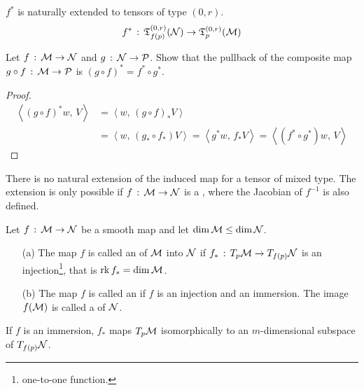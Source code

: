 \documentclass[a4paper, 10pt]{article}
\begin{document}
\begin{remark}
    $f^{\ast}$ is naturally extended to tensors of type $(0,r)$.
    \[ f^{\ast} \,:\, \mathfrak{T}^{(0,r)}_{f(p)}(\mathcal{N}) \rightarrow \mathfrak{T}^{(0,r)}_{p}(\mathcal{M}) \]
\end{remark}
\newpage


\begin{exer}
    Let $f\,:\,\mathcal{M}\rightarrow\mathcal{N}$ and $g\,:\,\mathcal{N}\rightarrow\mathcal{P}$. Show that the pullback of the composite map $g\circ f\,:\, \mathcal{M}\rightarrow\mathcal{P}$ is $(g\circ f)^{\ast} = f^{\ast} \circ g^{\ast}$.
\end{exer}
\begin{proof}
    \begin{align*}
        \left<(g\circ f)^{\ast}w,\,V\right> &= \left<w,\,(g\circ f)_{\ast}V\right> \\
        &= \left<w,\,(g_{\ast}\circ f_{\ast})V\right> = \left<g^{\ast}w,\,f_{\ast}V\right> = \left<(f^{\ast}\circ g^{\ast})w,\,V\right>
    \end{align*}
\end{proof}

\begin{remark}
    There is no natural extension of the induced map for a tensor of mixed type. The extension is only possible if $f\,:\,\mathcal{M}\rightarrow\mathcal{N}$ is a , where the Jacobian of $f^{-1}$ is also defined.
\end{remark}

\begin{definition}
    Let $f\,:\,\mathcal{M}\rightarrow\mathcal{N}$ be a smooth map and let $\dim \mathcal{M} \leq \dim \mathcal{N}$.
    \begin{itemize}
        \item[(a)] The map $f$ is called an  of $\mathcal{M}$ into $\mathcal{N}$ if $f_{\ast}\,:\,T_{p}\mathcal{M}\rightarrow T_{f(p)}\mathcal{N}$ is an injection\footnote{one-to-one function.}, that is $\mathrm{rk}\,f_{\ast} = \dim \mathcal{M}$.
        \item[(b)] The map $f$ is called an  if $f$ is an injection and an immersion. The image $f(\mathcal{M})$ is called a  of $\mathcal{N}$.
    \end{itemize}
\end{definition}

\begin{remark}
    If $f$ is an immersion, $f_{\ast}$ maps $T_{p}\mathcal{M}$ isomorphically to an $m$-dimensional subspace of $T_{f(p)}\mathcal{N}$.
\end{remark}
\end{document}
